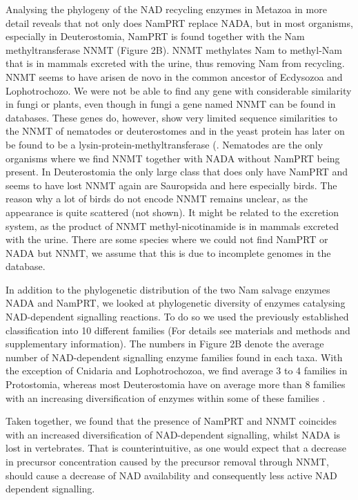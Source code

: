 Analysing the phylogeny of the NAD recycling enzymes in Metazoa in more detail reveals that not only does NamPRT replace NADA, but in most organisms, especially in Deuterostomia, NamPRT is found together with the Nam methyltransferase NNMT (Figure 2B). NNMT methylates Nam to methyl-Nam that is in mammals excreted with the urine, thus removing Nam from recycling. NNMT seems to have arisen de novo in the common ancestor of Ecdysozoa and Lophotrochozo.  We were not be able to find any gene with considerable similarity in fungi or plants, even though in fungi a gene named NNMT can be found in databases. These genes do, however, show very limited sequence similarities to the NNMT of nematodes or deuterostomes and in the yeast protein has later on be found to be a lysin-protein-methyltransferase  \cite{?}(. Nematodes are the only organisms where we find NNMT together with NADA without NamPRT being present. In Deuterostomia the only large class that does only have NamPRT and seems to have lost NNMT again are Sauropsida and here especially birds. The reason why a lot of birds do not encode NNMT remains unclear, as the appearance is quite scattered (not shown). It might be related to the excretion system, as the product of NNMT methyl-nicotinamide is in mammals excreted with the urine. There are some species where we could not find NamPRT or NADA but NNMT, we assume that this is due to incomplete genomes in the database.

In addition to the phylogenetic distribution of the two Nam salvage enzymes NADA and NamPRT, we looked at phylogenetic diversity of enzymes catalysing NAD-dependent signalling reactions. To do so we used the previously established classification into 10 different families \cite{Gossmann2012} (For details see materials and methods and supplementary information). The numbers in Figure 2B denote the average number of NAD-dependent signalling enzyme families found in each taxa. With the exception of Cnidaria and Lophotrochozoa, we find average 3 to 4 families in Protostomia, whereas most Deuterostomia have on average more than 8 families with an increasing diversification of enzymes within some of these families \cite{Gossmann2014}.

Taken together, we found that the presence of NamPRT and NNMT coincides with an increased diversification of NAD-dependent signalling, whilst NADA is lost in vertebrates. That is  counterintuitive, as one would expect that a decrease in precursor concentration caused by the precursor removal through NNMT, should cause a decrease of NAD availability and consequently less active NAD dependent signalling.


